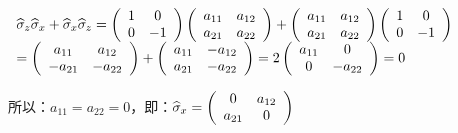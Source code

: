 $\begin{array}{l}
 \widehat\sigma _z \widehat\sigma _x  + \widehat\sigma _x \widehat\sigma _z  = \left( {\begin{array}{*{20}c}
   1 & 0  \\
   0 & { - 1}  \\
\end{array}} \right)\left( {\begin{array}{*{20}c}
   {a_{11} } & {a_{12} }  \\
   {a_{21} } & {a_{22} }  \\
\end{array}} \right) + \left( {\begin{array}{*{20}c}
   {a_{11} } & {a_{12} }  \\
   {a_{21} } & {a_{22} }  \\
\end{array}} \right)\left( {\begin{array}{*{20}c}
   1 & 0  \\
   0 & { - 1}  \\
\end{array}} \right) \\
  = \left( {\begin{array}{*{20}c}
   {a_{11} } & {a_{12} }  \\
   { - a_{21} } & { - a_{22} }  \\
\end{array}} \right) + \left( {\begin{array}{*{20}c}
   {a_{11} } & { - a_{12} }  \\
   {a_{21} } & { - a_{22} }  \\
\end{array}} \right) = 2\left( {\begin{array}{*{20}c}
   {a_{11} } & 0  \\
   0 & { - a_{22} }  \\
\end{array}} \right) = 0 \\
 \end{array}$

所以：$a_{11}  = a_{22}  = 0$，即：$\widehat\sigma _x  = \left( {\begin{array}{*{20}c}
   0 & {a_{12} }  \\
   {a_{21} } & 0  \\
\end{array}} \right)$


